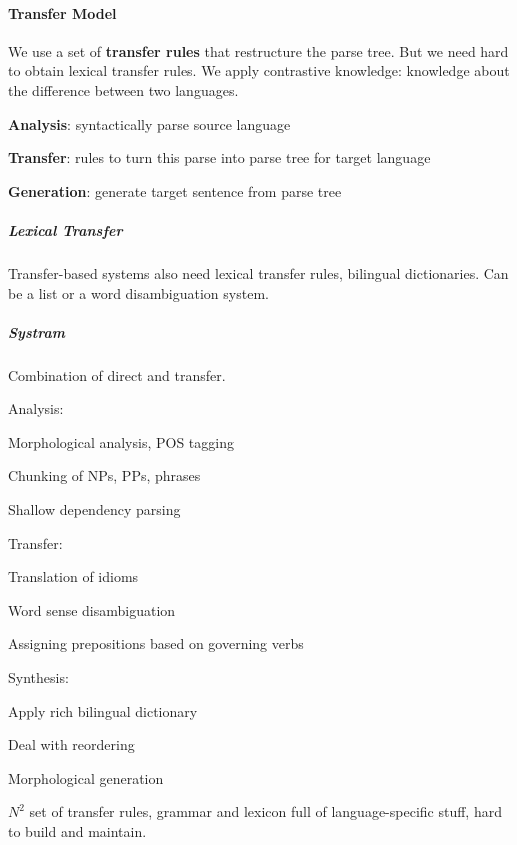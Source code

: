 \documentclass[10pt]{report}
\begin{document}
\paragraph{Transfer Model} We use a set of \textbf{transfer rules} that restructure the parse tree. But we need hard to obtain lexical transfer rules. We apply contrastive knowledge: knowledge about the difference between two languages.
\begin{list}{}{}
	\item \textbf{Analysis}: syntactically parse source language
	\item \textbf{Transfer}: rules to turn this parse into parse tree for target language
	\item \textbf{Generation}: generate target sentence from parse tree
\end{list}
\subparagraph{Lexical Transfer} Transfer-based systems also need lexical transfer rules, bilingual dictionaries. Can be a list or a word disambiguation system.
\subparagraph{Systram} Combination of direct and transfer.\begin{list}{}{}
	\item Analysis:\begin{list}{}{}
		\item Morphological analysis, POS tagging
		\item Chunking of NPs, PPs, phrases
		\item Shallow dependency parsing
	\end{list}
	\item Transfer:\begin{list}{}{}
		\item Translation of idioms
		\item Word sense disambiguation
		\item Assigning prepositions based on governing verbs
	\end{list}
	\item Synthesis:\begin{list}{}{}
		\item Apply rich bilingual dictionary
		\item Deal with reordering
		\item Morphological generation
	\end{list}
\end{list}
$N^2$ set of transfer rules, grammar and lexicon full of language-specific stuff, hard to build and maintain.
\end{document}
